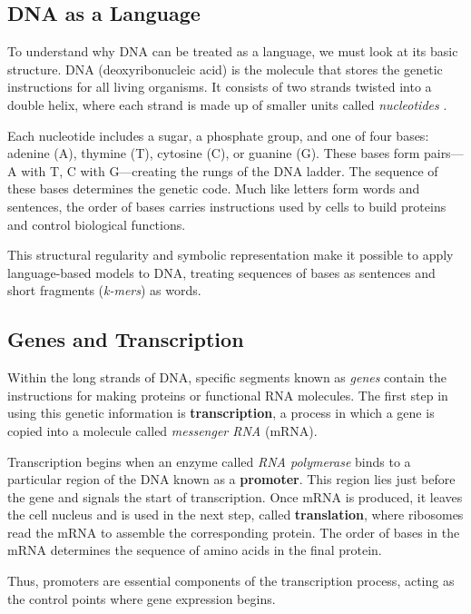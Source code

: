 \subsection{DNA as a Language}

To understand why DNA can be treated as a language, we must look at its basic structure. DNA (deoxyribonucleic acid) is the molecule that stores the genetic instructions for all living organisms. It consists of two strands twisted into a double helix, where each strand is made up of smaller units called \textit{nucleotides} \cite{4c869e6d-8c66-3ab2-a976-761dca85164d}.

Each nucleotide includes a sugar, a phosphate group, and one of four bases: adenine (A), thymine (T), cytosine (C), or guanine (G). These bases form pairs—A with T, C with G—creating the rungs of the DNA ladder. The sequence of these bases determines the genetic code. Much like letters form words and sentences, the order of bases carries instructions used by cells to build proteins and control biological functions.

This structural regularity and symbolic representation make it possible to apply language-based models to DNA, treating sequences of bases as sentences and short fragments (\textit{k-mers}) as words.

\subsection{Genes and Transcription}

Within the long strands of DNA, specific segments known as \textit{genes} contain the instructions for making proteins or functional RNA molecules. The first step in using this genetic information is \textbf{transcription}, a process in which a gene is copied into a molecule called \textit{messenger RNA} (mRNA).

Transcription begins when an enzyme called \textit{RNA polymerase} binds to a particular region of the DNA known as a \textbf{promoter}. This region lies just before the gene and signals the start of transcription. Once mRNA is produced, it leaves the cell nucleus and is used in the next step, called \textbf{translation}, where ribosomes read the mRNA to assemble the corresponding protein. The order of bases in the mRNA determines the sequence of amino acids in the final protein.

Thus, promoters are essential components of the transcription process, acting as the control points where gene expression begins.

